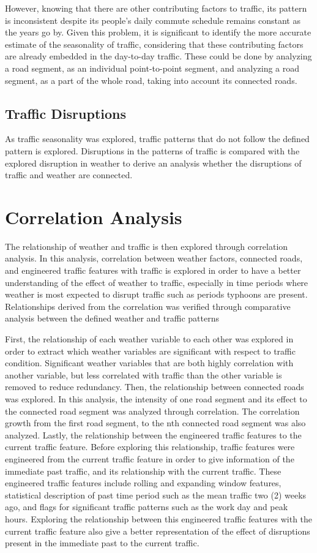 However, knowing that there are other contributing factors to traffic, its pattern is inconsistent despite its people’s daily commute schedule remains constant as the years go by. Given this problem, it is significant to identify the more accurate estimate of the seasonality of traffic, considering that these contributing factors are already embedded in the day-to-day traffic. These could be done by analyzing a road segment, as an individual point-to-point segment, and analyzing a road segment, as a part of the whole road, taking into account its connected roads. 

\subsection{Traffic Disruptions}
As traffic seasonality was explored, traffic patterns that do not follow the defined pattern is explored. Disruptions in the patterns of traffic is compared with the explored disruption in weather to derive an analysis whether the disruptions of traffic and weather are connected. 

\section{Correlation Analysis}
The relationship of weather and traffic is then explored through correlation analysis. In this analysis, correlation between weather factors, connected roads, and engineered traffic features with traffic is explored in order to have a better understanding of the effect of weather to traffic, especially in time periods where weather is most expected to disrupt traffic such as periods typhoons are present. Relationships derived from the correlation was verified through comparative analysis between the defined weather and traffic patterns

First, the relationship of each weather variable to each other was explored in order to extract which weather variables are significant with respect to traffic condition. Significant weather variables that are both highly correlation with another variable, but less correlated with traffic than the other variable is removed to reduce redundancy. Then, the relationship between connected roads was explored. In this analysis, the intensity of one road segment and its effect to the connected road segment was analyzed through correlation. The correlation growth from the first road segment, to the nth connected road segment was also analyzed.  Lastly, the relationship between the engineered traffic features to the current traffic feature. Before exploring this relationship, traffic features were engineered from the current traffic feature in order to give information of the immediate past traffic, and its relationship with the current traffic. These engineered traffic features include rolling and expanding window features, statistical description of past time period such as the mean traffic two (2) weeks ago, and flags for significant traffic patterns such as the work day and peak hours. Exploring the relationship between this engineered traffic features with the current traffic feature also give a better representation of the effect of disruptions present in the immediate past to the current traffic. 

